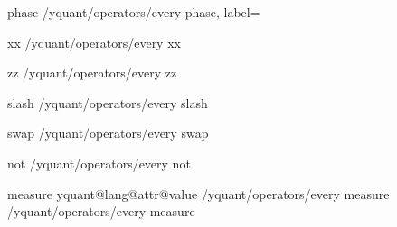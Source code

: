 \yquant@langhelper@declare@command%
   {phase}%
   {}%
   {%
      \edef\cmd{%
         \yquant@prepare%
            {}%
            {/yquant/operators/every phase, label={\unexpanded\expandafter{\yquant@lang@attr@value}}}%
      }%
      \cmd%
   }
%

\yquant@langhelper@declare@command%
   {xx}%
   \yquant@register@get@multiassingle%
   {%
      \yquant@prepare%
         {}%
         {/yquant/operators/every xx}%
   }

\yquant@langhelper@declare@command@uncontrolled%
   {zz}%
   \yquant@register@get@multiassingle%
   {%
      \yquant@prepare%
         {}%
         {/yquant/operators/every zz}%
   }

\yquant@langhelper@declare@command@uncontrolled%
   {slash}%
   {}%
   {%
      \preto{}%
      \yquant@prepare%
         {}%
         {/yquant/operators/every slash}%
   }

\yquant@langhelper@declare@command%
   {swap}%
   \yquant@register@get@multiassingle
   {%
      \yquant@prepare%
         {}%
         {/yquant/operators/every swap}%
   }

\yquant@langhelper@declare@command%
   {not}%
   {}%
   {%
      \yquant@prepare%
         {}%
         {/yquant/operators/every not}%
   }

\yquant@langhelper@declare@command@uncontrolled%
   {measure}%
   \yquant@register@get@allowmultitrue%
   {%
      \ifdefined\yquant@lang@attr@type%
         \yquant@register@type@fromstring\yquant@lang@attr@type\yquant@circuit@settype@to%
      \else%
         \let\yquant@circuit@settype@to=\yquant@register@type@c%
      \fi%
      \let\yquant@prepare@callback@prepare=\yquant@circuit@settype@prepare%
      \let\yquant@prepare@callback@draw=\yquant@circuit@settype%
      \unless\ifcsname yquant@lang@attr@value\endcsname%
         \let\yquant@lang@attr@value=\empty%
      \fi%
      \ifdefined\yquant@lang@attr@directcontrol%
         \expandafter\yquant@prepare@injection%
            \expandafter{\yquant@lang@attr@value}%
            {/yquant/operators/every measure}%
      \else%
         \expandafter\yquant@prepare%
            \expandafter{\yquant@lang@attr@value}%
            {/yquant/operators/every measure}%
      \fi%
   }

